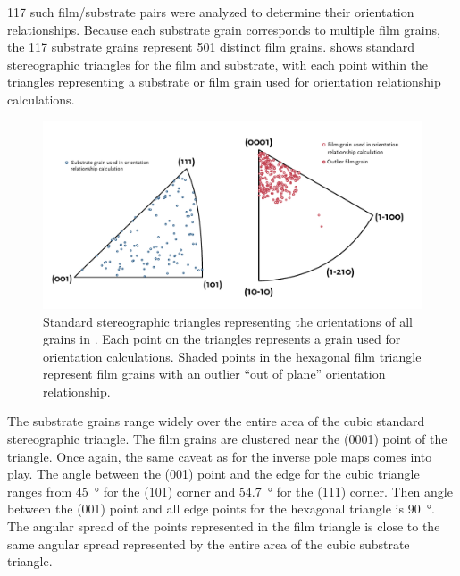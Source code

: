 117 such film/substrate pairs were analyzed to determine their orientation relationships.
Because each substrate grain corresponds to multiple film grains, the 117 substrate grains
represent 501 distinct film grains.  shows standard stereographic
triangles for the film and substrate, with each point within the triangles representing a
substrate or film grain used for orientation relationship calculations.
\begin{figure}
	\includegraphics[width=\textwidth]{subfilmipfs.pdf}
		\caption[Orientation of film and substrate grains]{%
			Standard stereographic triangles representing the orientations
			of all grains in . Each point on the 
			triangles represents a grain used for orientation calculations.
			Shaded points in the hexagonal film triangle represent film grains
			with an outlier ``out of plane'' orientation relationship.}
	\label{fig:subfilmipfs}
\end{figure}
The substrate grains range widely over the entire area of the cubic standard stereographic
triangle. The film grains are clustered near the (0001) point of the triangle. Once again,
the same caveat as for the inverse pole maps comes into play. The angle between the (001)
point and the edge for the cubic triangle ranges from \SI{45}{\degree} for the (101)
corner and \SI{54.7}{\degree} for the (111) corner. Then angle between the (001) point and
all edge points for the hexagonal triangle is \SI{90}{\degree}. The angular spread of the
points represented in the film triangle is close to the same angular spread represented by
the entire area of the cubic substrate triangle.
